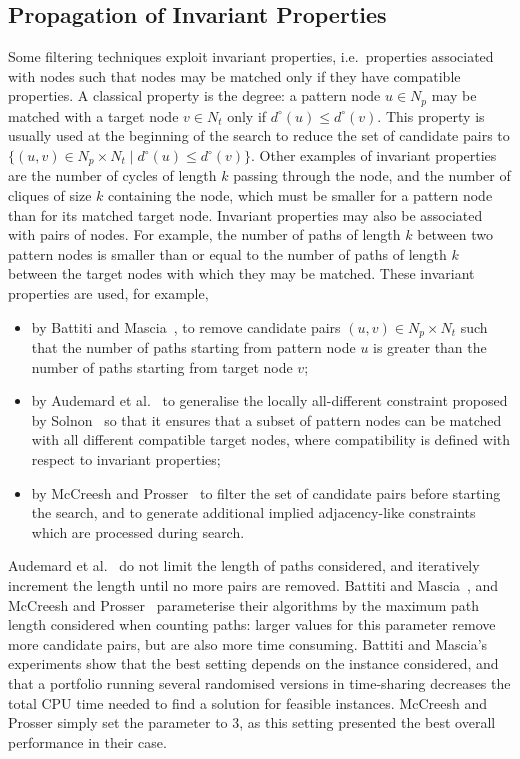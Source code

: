\documentclass{llncs}
\begin{document}
\subsection{Propagation of Invariant Properties}

Some filtering techniques exploit invariant properties, i.e.\ properties associated with nodes such
that nodes may be matched only if they have compatible properties. A classical property is the
degree: a pattern node $u\in N_p$ may be matched with a target node $v\in N_t$ only if
$d^\circ(u)\leq d^\circ(v)$. This property is usually used at the beginning of the search to reduce
the set of candidate pairs to $\{(u,v)\in N_p\times N_t\;|\;d^\circ(u)\leq d^\circ(v)\}$.  Other
examples of invariant properties are the number of cycles of length $k$ passing through the node,
and the number of cliques of size $k$ containing the node, which must be smaller for a pattern node
than for its matched target node.  Invariant properties may also be associated with pairs of nodes.
For example, the number of paths of length $k$ between two pattern nodes is smaller than or equal to
the number of paths of length $k$ between the target nodes with which they may be matched.
These invariant properties are used, for example,

\begin{itemize}[nosep]
\item by Battiti and Mascia~\cite{battiti-mascia07}, to remove candidate pairs $(u,v)\in N_p\times
    N_t$ such that the number of paths starting from  pattern node $u$ is greater than the number of
    paths starting from  target node $v$;
\item by Audemard et al.~\cite{Audemard:2014} to generalise the locally all-different constraint
    proposed by Solnon~\cite{Solnon:2010} so that it ensures that a subset of pattern nodes can be
    matched with all different compatible target nodes, where compatibility is defined with respect
    to invariant properties;
\item by McCreesh and Prosser~\cite{McCreesh:2015} to filter the set of candidate pairs before
    starting the search, and to generate additional implied adjacency-like constraints which are
    processed during search.
\end{itemize}

\noindent Audemard et al.~\cite{Audemard:2014} do not limit the length of paths considered, and
iteratively increment the length until no more pairs are removed. Battiti and Mascia~\cite{battiti-mascia07}, and McCreesh and Prosser~\cite{McCreesh:2015} parameterise their algorithms
by the maximum path length considered when counting paths: larger values for this parameter remove
more candidate pairs, but are also more time consuming. Battiti and Mascia's experiments show that
the best setting depends on the instance considered, and that a portfolio running several randomised
versions in time-sharing decreases the total CPU time needed to find a solution for feasible
instances. McCreesh and Prosser simply set the parameter to 3, as this setting
presented the best overall performance in their case.
\end{document}

